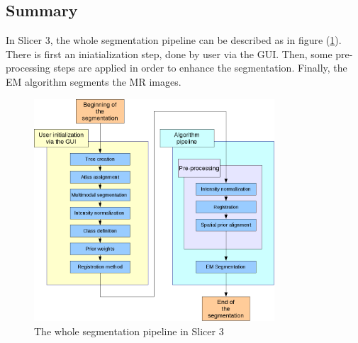 \subsection{Summary}
In Slicer 3, the whole segmentation pipeline can be described as in figure (\ref{fig:Wpipeline}). There is first an iniatialization step, done by user via the GUI. Then, some pre-processing steps are applied in order to enhance the segmentation. Finally, the EM algorithm segments the MR images.

  \begin{figure}[ht]\centering
  \includegraphics[width=0.8\textwidth]{Images/Graphics/wholepipeline.png}
  \caption{The whole segmentation pipeline in Slicer 3}\label{fig:Wpipeline}
  \end{figure}

%
